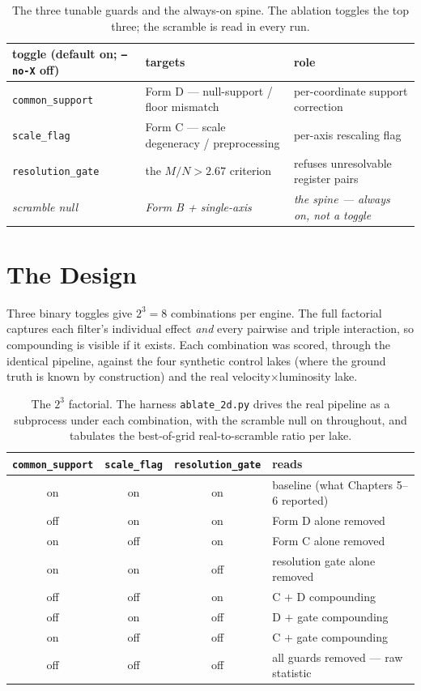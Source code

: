 \documentclass[11pt, letterpaper, openany]{book}
\newcommand{\MN}{M/N}
\begin{document}
\begin{table}[H]
\centering
\small
\begin{tabular}{@{}p{3.2cm}p{5.9cm}p{4.6cm}@{}}
\toprule
\textbf{toggle (default on; \texttt{--no-X} off)} & \textbf{targets} & \textbf{role} \\
\midrule
\texttt{common\_support} & Form D --- null-support / floor mismatch & per-coordinate support correction \\
\texttt{scale\_flag}     & Form C --- scale degeneracy / preprocessing & per-axis rescaling flag \\
\texttt{resolution\_gate}& the $\MN > 2.67$ criterion & refuses unresolvable register pairs \\
\midrule
\textit{scramble null}   & \textit{Form B + single-axis} & \textit{the spine --- always on, not a toggle} \\
\bottomrule
\end{tabular}
\caption{The three tunable guards and the always-on spine. The ablation toggles the top three; the
scramble is read in every run.}
\end{table}

\section{The Design}

Three binary toggles give $2^3 = 8$ combinations per engine. The full factorial captures each filter's
individual effect \emph{and} every pairwise and triple interaction, so compounding is visible if it
exists. Each combination was scored, through the identical pipeline, against the four synthetic control
lakes (where the ground truth is known by construction) and the real velocity$\times$luminosity lake.

\begin{table}[H]
\centering
\small
\begin{tabular}{@{}cccl@{}}
\toprule
\texttt{common\_support} & \texttt{scale\_flag} & \texttt{resolution\_gate} & reads \\
\midrule
on  & on  & on  & baseline (what Chapters 5--6 reported) \\
off & on  & on  & Form D alone removed \\
on  & off & on  & Form C alone removed \\
on  & on  & off & resolution gate alone removed \\
off & off & on  & C $+$ D compounding \\
off & on  & off & D $+$ gate compounding \\
on  & off & off & C $+$ gate compounding \\
off & off & off & all guards removed --- raw statistic \\
\bottomrule
\end{tabular}
\caption{The $2^3$ factorial. The harness \texttt{ablate\_2d.py} drives the real pipeline as a
subprocess under each combination, with the scramble null on throughout, and tabulates the
best-of-grid real-to-scramble ratio per lake.}
\end{table}
\end{document}
